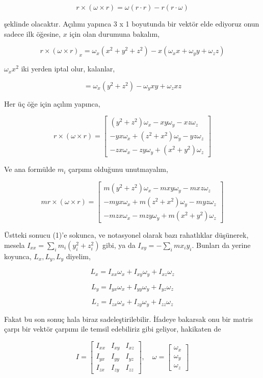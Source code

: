 \documentclass[12pt,fleqn]{article}\usepackage{../../common}
\begin{document}
$$
r \times (\omega \times r) = \omega (r \cdot r) - r(r \cdot \omega)
$$

şeklinde olacaktır. Açılımı yapınca 3 x 1 boyutunda bir vektör elde ediyoruz
onun sadece ilk öğesine, $x$ için olan durumuna bakalım,

$$
r \times (\omega \times r)_x = \omega_x (x^2 + y^2 + z^2) - x(\omega_x x + \omega_y y + \omega_z z)
$$

$\omega_x x^2$ iki yerden iptal olur, kalanlar,

$$
 = \omega_x ( y^2 + z^2) - \omega_y xy + \omega_z xz
$$

Her üç öğe için açılım yapınca,

$$
r \times (\omega \times r) =
\left[\begin{array}{c}
(y^2 + z^2) \omega_x - xy \omega_y - xz \omega_z \\
-yx \omega_x + (z^2 + x^2)\omega_y - yz \omega_z \\    
-zx \omega_x - zy \omega_y + (x^2+y^2)\omega_z
\end{array}\right]
$$

Ve ana formülde $m_i$ çarpımı olduğunu unutmayalım,

$$
m r \times (\omega \times r) =
\left[\begin{array}{c}
m (y^2 + z^2) \omega_x - m xy \omega_y - m xz \omega_z \\
-m yx \omega_x + m (z^2 + x^2)\omega_y - m yz \omega_z \\    
-m zx \omega_x - m zy \omega_y + m (x^2+y^2)\omega_z
\end{array}\right]
$$

Üstteki sonucu (1)'e sokunca, ve notasyonel olarak bazı rahatlıklar düşünerek,
mesela $I_{xx} = \sum_i m_i (y_i^2 + z_i^2)$ gibi, ya da $I_{xy} = - \sum_i m x_i y_i$.
Bunları da yerine koyunca, $L_x,L_y,L_y$ diyelim,

$$
L_x = I_{xx} \omega_x + I_{xy} \omega_y + I_{xz} \omega_z
$$

$$
L_y = I_{yx} \omega_x + I_{yy} \omega_y + I_{yz} \omega_z
$$

$$
L_z = I_{zx} \omega_x + I_{zy} \omega_y + I_{zz} \omega_z
$$

Fakat bu son sonuç hala biraz sadeleştirilebilir. İfadeye bakarsak onu bir
matris çarpı bir vektör çarpımı ile temsil edebiliriz gibi geliyor,
hakikaten de

$$
I = \left[\begin{array}{ccc}
I_{xx} & I_{xy} & I_{xz} \\
I_{yx} & I_{yy} & I_{yz} \\
I_{zx} & I_{zy} & I_{zz} 
\end{array}\right], \quad
\omega = \left[\begin{array}{c}
\omega_x \\ \omega_y \\ \omega_z
\end{array}\right]
$$
\end{document}
